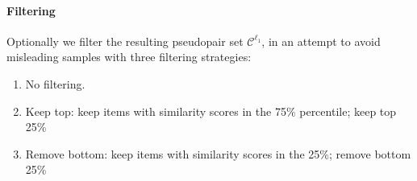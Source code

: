 \begin{comment}


This is summarized in Algorithm~\ref{alg:sentsim}.

\begin{algorithm}
\begin{algorithmic}
\State $pseudo\_caps \Leftarrow [\;]$
\For{$c_2 \in D_2$} 
    \State $\hat{c_2}$ = arg max $sim(c_1, C_1)$
    \State $pseudo\_caps$.add($\hat{c_2}$)
\EndFor
\end{algorithmic}
\caption{Pseudo-pairs based on sentence-similarities.}
\label{alg:sentsim}
\end{algorithm}
\end{comment}

\begin{comment}

\paragraph{2. Image-similarities} are the second option we explored. 
This approach is the same as the sentence similarities just the other way 
around as in as shown in Algorithm~\ref{alg:imgsim}.
\begin{algorithm}
\begin{algorithmic}
\State $pseudo\_imgs \Leftarrow [\;]$
\For{$i_2 \in D_2$} 
    \State $\hat{i_1}$ = arg max $sim(i_2, I_1)$
    \State $pseudo\_imgs$.add($\hat{i_1}$)
\EndFor
\end{algorithmic}
\caption{Pseudo-pairs based on image-similarities.}
\label{alg:imgsim}
\end{algorithm}
\end{comment}

\paragraph{Filtering}

Optionally we filter 
the resulting pseudopair set $\mathcal{C}^{\ell_1}$, in an attempt to
avoid misleading samples with three filtering strategies:

\begin{enumerate}
    \item No filtering.
    \item Keep top: keep items with similarity scores in the 75\% percentile; keep top 25\% 
    \item Remove bottom: keep items with similarity scores in the 25\%; remove bottom 25\%
\end{enumerate}

